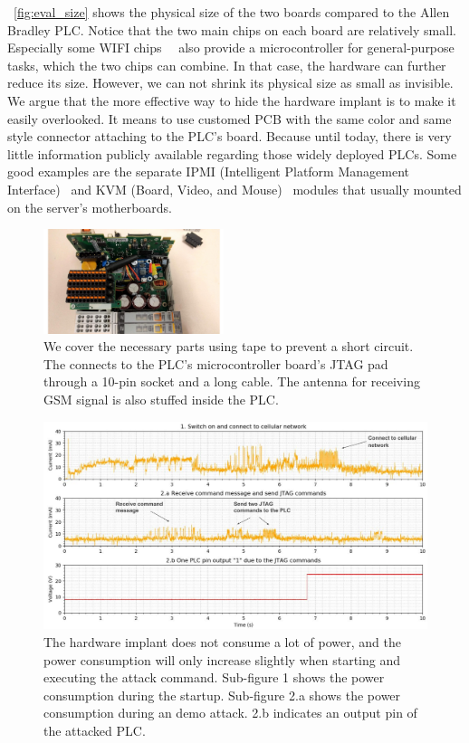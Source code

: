 ~\autoref{fig:eval_size} shows the physical size of the two boards compared to the Allen Bradley PLC. Notice that the two main chips on each board are relatively small. Especially some WIFI chips~\cite{babiuch2019using}~\cite{artenstein2017broadpwn} also provide a microcontroller for general-purpose tasks, which the two chips can combine.  In that case, the hardware can further reduce its size. However, we can not shrink its physical size as small as invisible.  We argue that the more effective way to hide the hardware implant is to make it easily overlooked. It means to use customed PCB with the same color and same style connector attaching to the PLC's board. Because until today, there is very little information publicly available regarding those widely deployed PLCs.  Some good examples are the separate IPMI (Intelligent Platform Management Interface)~\cite{slaight2003using} and KVM (Board, Video, and Mouse)~\cite{kedziorek2007hpc} modules that usually mounted on the server's motherboards.

\begin{figure}[h]
	\includegraphics[width=0.47\textwidth]{figures/eval_a}
	\centering
	\caption{We cover the necessary parts using tape to prevent a short circuit. The \name connects to the PLC's microcontroller board's JTAG pad through a 10-pin socket and a long cable. The antenna for receiving GSM signal is also stuffed inside the PLC.}
	\label{fig:eval_a}
\end{figure}

\begin{figure}[t]
	\includegraphics[width=\textwidth]{figures/current}
	\centering
	\caption{The hardware implant does not consume a lot of power, and the power consumption will only increase slightly when starting and executing the attack command. Sub-figure 1 shows the power consumption during the startup. Sub-figure 2.a shows the power consumption during an demo attack. 2.b indicates an output pin of the attacked PLC. }
	\label{fig:current}
\end{figure}


